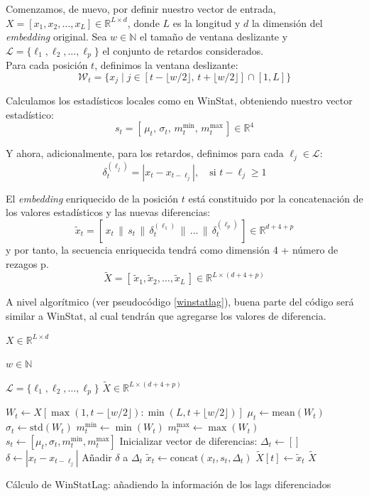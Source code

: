 Comenzamos, de nuevo, por definir nuestro vector de entrada, $X = [x_1, x_2, \dots, x_L] \in \mathbb{R}^{L \times d}$, donde $L$ es la longitud y $d$ la dimensión del \textit{embedding} original. Sea $w \in \mathbb{N}$ el tamaño de ventana deslizante y $\mathcal{L} = \{\ell_1, \ell_2, \dots, \ell_p\}$ el conjunto de retardos considerados.\\

Para cada posición $t$, definimos la ventana deslizante:
\[
\mathcal{W}_t = \{ x_j \mid j \in [t - \lfloor w/2 \rfloor,\, t + \lfloor w/2 \rfloor] \cap [1, L] \}
\]

Calculamos los estadísticos locales como en WinStat, obteniendo nuestro vector estadístico:
\[
s_t = [\,\mu_t,\, \sigma_t,\, m^{\min}_t,\, m^{\max}_t\,] \in \mathbb{R}^4
\]

Y ahora, adicionalmente, para los retardos, definimos para cada $\ell_j \in \mathcal{L}$:
\[
\delta_t^{(\ell_j)} = | x_t - x_{t - \ell_j}|, \quad \text{si } t - \ell_j \geq 1
\]

El \textit{embedding} enriquecido de la posición $t$ está constituido por la concatenación de los valores estadísticos y las nuevas diferencias:
\[
\tilde{x}_t = [\,x_t \,\|\, s_t \,\|\, \delta_t^{(\ell_1)} \,\|\, \dots \,\|\, \delta_t^{(\ell_p)}\,] \in \mathbb{R}^{d + 4 + p}
\]
y por tanto, la secuencia enriquecida tendrá como dimensión 4 + número de rezagos p.
\[
\tilde{X} = [\,\tilde{x}_1, \tilde{x}_2, \dots, \tilde{x}_L\,] \in \mathbb{R}^{L \times (d+4+p )}
\]

A nivel algorítmico (ver pseudocódigo \ref{winstatlag}), buena parte del código será similar a WinStat, al cual tendrán que agregarse los valores de diferencia.

\begin{algorithm}[H]
	\begin{algorithmic}[1]
		\Require 
		
		$X \in \mathbb{R}^{L \times d}$ 
		
		$w \in \mathbb{N}$ 
		
		$\mathcal{L} = \{\ell_1, \ell_2, \dots, \ell_p\}$ 
		\Ensure 
		$\tilde{X} \in \mathbb{R}^{L \times (d + 4 + p)}$
		
		\State $W_t \gets X[\max(1, t - \lfloor w/2 \rfloor) : \min(L, t + \lfloor w/2 \rfloor)]$
		\State $\mu_t \gets \text{mean}(W_t)$
		\State $\sigma_t \gets \text{std}(W_t)$
		\State $m^{\min}_t \gets \min(W_t)$
		\State $m^{\max}_t \gets \max(W_t)$
		\State $s_t \gets [\mu_t, \sigma_t, m^{\min}_t, m^{\max}_t]$
		\State Inicializar vector de diferencias: $\Delta_t \gets []$
		\State $\delta \gets |x_t - x_{t - \ell_j}|$
		\State Añadir $\delta$ a $\Delta_t$
		\EndIf
		\EndFor
		\State $\tilde{x}_t \gets \text{concat}(x_t, s_t, \Delta_t)$
		\State $\tilde{X}[t] \gets \tilde{x}_t$
		\EndFor
		\State \Return $\tilde{X}$
	\end{algorithmic}
	\caption{Cálculo de WinStatLag: añadiendo la información de los lags diferenciados}
	\label{winstatlag}
\end{algorithm}

